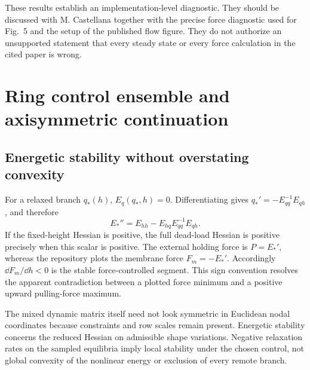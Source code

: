 These results establish an implementation-level diagnostic. They should be discussed with M. Castellana together with the precise force diagnostic used for Fig.~5 and the setup of the published flow figure. They do not authorize an unsupported statement that every steady state or every force calculation in the cited paper is wrong.

\section{Ring control ensemble and axisymmetric continuation}
\subsection{Energetic stability without overstating convexity}
For a relaxed branch $q_*(h)$, $E_q(q_*,h)=0$. Differentiating gives $q_*'=-E_{qq}^{-1}E_{qh}$, and therefore
\begin{equation}
E_*''=E_{hh}-E_{hq}E_{qq}^{-1}E_{qh}.
\end{equation}
If the fixed-height Hessian is positive, the full dead-load Hessian is positive precisely when this scalar is positive. The external holding force is $P=E_*'$, whereas the repository plots the membrane force $F_m=-E_*'$. Accordingly $\dd F_m/\dd h<0$ is the stable force-controlled segment. This sign convention resolves the apparent contradiction between a plotted force minimum and a positive upward pulling-force maximum.

The mixed dynamic matrix itself need not look symmetric in Euclidean nodal coordinates because constraints and row scales remain present. Energetic stability concerns the reduced Hessian on admissible shape variations. Negative relaxation rates on the sampled equilibria imply local stability under the chosen control, not global convexity of the nonlinear energy or exclusion of every remote branch.

